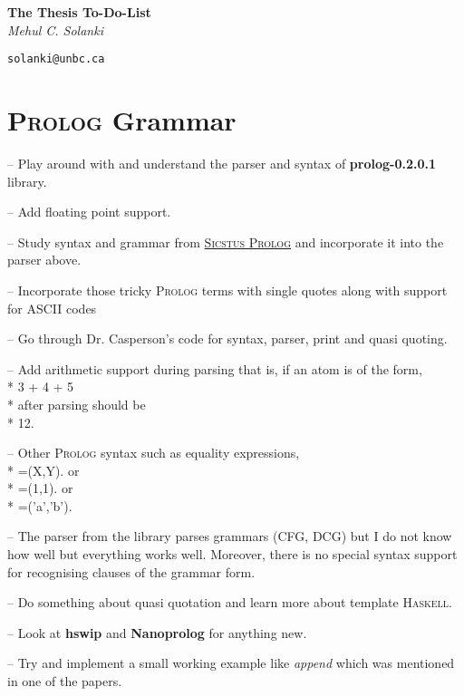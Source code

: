 \documentclass[11pt]{article}
\let\oldmarginpar\marginpar
\renewcommand\marginpar[1]{\-\oldmarginpar[\raggedleft #1]%
{\raggedright #1}}
\newenvironment{checklist}{%
  \begin{list}{}{}%
  \let\olditem\item
  \renewcommand\item{\olditem -- \marginpar{$\Box$} }
  \newcommand\checkeditem{\olditem -- \marginpar{$\CheckedBox$} }
}{%
  \end{list}
}
\begin{document}
\begin{titlepage}
   \begin{center}
      \huge\textbf{The Thesis To-Do-List}\\
      \Large\textit{Mehul C. Solanki} \\
      \date{\today} 
      \large\texttt{solanki@unbc.ca} \\
   \end{center}
\end{titlepage}

\tableofcontents
\clearpage

\section{\textsc{Prolog} Grammar}
\begin{checklist}
  \checkeditem   Play around with and understand the parser and syntax of \textbf{prolog-0.2.0.1} library. 
  
  \checkeditem  Add floating point support. 
  
  \item   Study  syntax and grammar from 
 \href{http://sicstus.sics.se/sicstus/docs/3.7.1/html/sicstus_45.html}{\textsc{Sicstus Prolog}}
 and incorporate it into the parser above.
 
 \item Incorporate those tricky \textsc{Prolog} terms with single quotes along with  support for ASCII codes
 
 \item Go through Dr. Casperson's code for syntax, parser, print and quasi quoting.
 
 \item Add arithmetic support during parsing that is, if an atom is of the form,
 \\* 3 + 4 + 5
 \\* after parsing should be 
 \\* 12.
 
 \item  Other \textsc{Prolog} syntax such as equality expressions,
 \\* =(X,Y). or
 \\* =(1,1). or
 \\* =('a','b').
 
 \item The parser from the library parses grammars (CFG, DCG) but I do not know how well but everything works well. Moreover, there is no 
 special syntax support for recognising clauses of the grammar form.  
  
 \item Do something about quasi quotation and learn more about template \textsc{Haskell}.
 
 \item Look at \textbf{hswip} and \textbf{Nanoprolog} for anything new.
 
 \item Try and implement a small working example like \textit{append} which was mentioned in one of the papers. 
\end{checklist}
\end{document}
